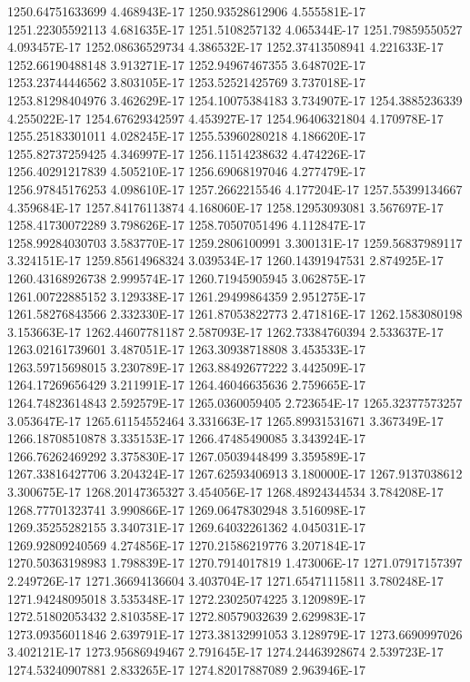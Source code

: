 1250.64751633699  4.468943E-17
1250.93528612906  4.555581E-17
1251.22305592113  4.681635E-17
1251.5108257132  4.065344E-17
1251.79859550527  4.093457E-17
1252.08636529734  4.386532E-17
1252.37413508941  4.221633E-17
1252.66190488148  3.913271E-17
1252.94967467355  3.648702E-17
1253.23744446562  3.803105E-17
1253.52521425769  3.737018E-17
1253.81298404976  3.462629E-17
1254.10075384183  3.734907E-17
1254.3885236339  4.255022E-17
1254.67629342597  4.453927E-17
1254.96406321804  4.170978E-17
1255.25183301011  4.028245E-17
1255.53960280218  4.186620E-17
1255.82737259425  4.346997E-17
1256.11514238632  4.474226E-17
1256.40291217839  4.505210E-17
1256.69068197046  4.277479E-17
1256.97845176253  4.098610E-17
1257.2662215546  4.177204E-17
1257.55399134667  4.359684E-17
1257.84176113874  4.168060E-17
1258.12953093081  3.567697E-17
1258.41730072289  3.798626E-17
1258.70507051496  4.112847E-17
1258.99284030703  3.583770E-17
1259.2806100991  3.300131E-17
1259.56837989117  3.324151E-17
1259.85614968324  3.039534E-17
1260.14391947531  2.874925E-17
1260.43168926738  2.999574E-17
1260.71945905945  3.062875E-17
1261.00722885152  3.129338E-17
1261.29499864359  2.951275E-17
1261.58276843566  2.332330E-17
1261.87053822773  2.471816E-17
1262.1583080198  3.153663E-17
1262.44607781187  2.587093E-17
1262.73384760394  2.533637E-17
1263.02161739601  3.487051E-17
1263.30938718808  3.453533E-17
1263.59715698015  3.230789E-17
1263.88492677222  3.442509E-17
1264.17269656429  3.211991E-17
1264.46046635636  2.759665E-17
1264.74823614843  2.592579E-17
1265.0360059405  2.723654E-17
1265.32377573257  3.053647E-17
1265.61154552464  3.331663E-17
1265.89931531671  3.367349E-17
1266.18708510878  3.335153E-17
1266.47485490085  3.343924E-17
1266.76262469292  3.375830E-17
1267.05039448499  3.359589E-17
1267.33816427706  3.204324E-17
1267.62593406913  3.180000E-17
1267.9137038612  3.300675E-17
1268.20147365327  3.454056E-17
1268.48924344534  3.784208E-17
1268.77701323741  3.990866E-17
1269.06478302948  3.516098E-17
1269.35255282155  3.340731E-17
1269.64032261362  4.045031E-17
1269.92809240569  4.274856E-17
1270.21586219776  3.207184E-17
1270.50363198983  1.798839E-17
1270.7914017819  1.473006E-17
1271.07917157397  2.249726E-17
1271.36694136604  3.403704E-17
1271.65471115811  3.780248E-17
1271.94248095018  3.535348E-17
1272.23025074225  3.120989E-17
1272.51802053432  2.810358E-17
1272.80579032639  2.629983E-17
1273.09356011846  2.639791E-17
1273.38132991053  3.128979E-17
1273.6690997026  3.402121E-17
1273.95686949467  2.791645E-17
1274.24463928674  2.539723E-17
1274.53240907881  2.833265E-17
1274.82017887089  2.963946E-17
